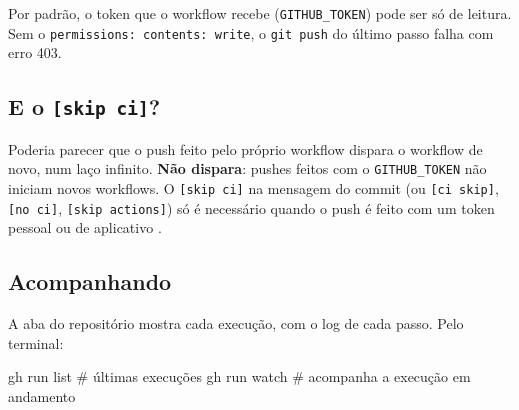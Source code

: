 \begin{aviso}
Por padrão, o token que o workflow recebe (\texttt{GITHUB\_TOKEN}) pode ser
só de leitura. Sem o \texttt{permissions: contents: write}, o
\texttt{git push} do último passo falha com erro 403.
\end{aviso}

\subsection{E o \texttt{[skip ci]}?}

Poderia parecer que o push feito pelo próprio workflow dispara o workflow de
novo, num laço infinito. \textbf{Não dispara}: pushes feitos com o
\texttt{GITHUB\_TOKEN} não iniciam novos workflows. O \texttt{[skip ci]} na
mensagem do commit (ou \texttt{[ci skip]}, \texttt{[no ci]},
\texttt{[skip actions]}) só é necessário quando o push é feito com um token
pessoal ou de aplicativo \cite{github_skip}.

\subsection{Acompanhando}

A aba  do repositório mostra cada execução, com o log de cada
passo. Pelo terminal:

\begin{bashcode}
gh run list          # últimas execuções
gh run watch         # acompanha a execução em andamento
\end{bashcode}
